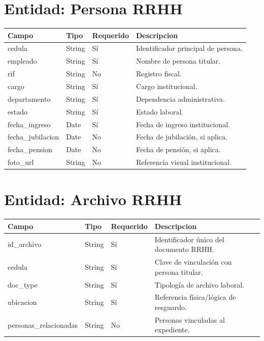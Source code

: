 \section{Entidad: Persona RRHH}
\begin{longtable}{p{} p{} p{} p{}}
\toprule
\textbf{Campo} & \textbf{Tipo} & \textbf{Requerido} & \textbf{Descripcion} \\
\midrule
cedula & String & Sí & Identificador principal de persona. \\
empleado & String & Sí & Nombre de persona titular. \\
rif & String & No & Registro fiscal. \\
cargo & String & Sí & Cargo institucional. \\
departamento & String & Sí & Dependencia administrativa. \\
estado & String & Sí & Estado laboral. \\
fecha\_ingreso & Date & Sí & Fecha de ingreso institucional. \\
fecha\_jubilacion & Date & No & Fecha de jubilación, si aplica. \\
fecha\_pension & Date & No & Fecha de pensión, si aplica. \\
foto\_url & String & No & Referencia visual institucional. \\
\bottomrule
\end{longtable}

\section{Entidad: Archivo RRHH}
\begin{longtable}{p{} p{} p{} p{}}
\toprule
\textbf{Campo} & \textbf{Tipo} & \textbf{Requerido} & \textbf{Descripcion} \\
\midrule
id\_archivo & String & Sí & Identificador único del documento RRHH. \\
cedula & String & Sí & Clave de vinculación con persona titular. \\
doc\_type & String & Sí & Tipología de archivo laboral. \\
ubicacion & String & Sí & Referencia física/lógica de resguardo. \\
personas\_relacionadas & String & No & Personas vinculadas al expediente. \\
\bottomrule
\end{longtable}
